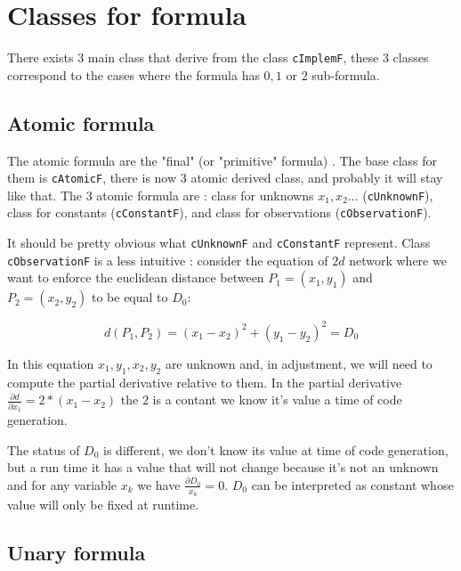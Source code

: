 \section{Classes for  formula}

There exists $3$ main class that derive from the class {\tt cImplemF}, these $3$ classes
correspond to the cases where the formula has $0,1$ or $2$ sub-formula.

\subsection{Atomic formula}

The atomic formula are the "final" (or "primitive" formula) .  The base
class for them is {\tt cAtomicF}, there is now $3$ atomic derived class, and
probably it will stay like that. The $3$ atomic formula are : 
class for unknowns $x_1,x_2\dots$ ({\tt cUnknownF}), class for constants ({\tt cConstantF}),
and class for observations ({\tt cObservationF}).

It should be pretty obvious what {\tt cUnknownF}  and {\tt cConstantF} represent.
Class {\tt cObservationF} is a less intuitive : consider the equation of 
$2d$ network  where we want to enforce the euclidean distance between $P_1=(x_1,y_1)$ and $P_2=(x_2,y_2)$
to be equal to $D_0$:

\begin{equation}
   d(P_1,P_2) = (x_1-x_2)^2 + (y_1-y_2)^2 = D_0
\end{equation}

In this equation $x_1,y_1,x_2,y_2$ are unknown and, in adjustment, we will need to compute 
the partial derivative relative to them. In the partial derivative $\frac{\partial d}{\partial x_1} = 2*(x_1-x_2)$
the $2$ is a contant we know it's value a time of code generation.

The status of $D_0$ is different, we don't know its value at time of code generation, but a run time
it has a value that will not change because it's not an unknown and for any variable $x_k$  we have $\frac{\partial D_0}{x_k} =0$.
$D_0$ can be interpreted as constant whose value will only be fixed at runtime.



\subsection{Unary formula}

